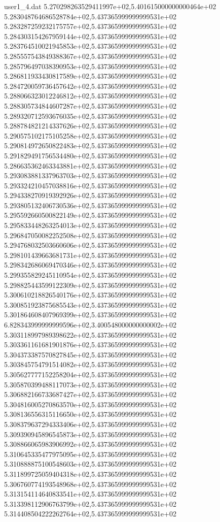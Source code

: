 \begin{filecontents}{user1_4.dat}
5.270298263529411997e+02,5.401615000000000464e+02
5.283048764686528784e+02,5.437365999999999531e+02
5.283287259232175757e+02,5.437365999999999531e+02
5.284303154267959144e+02,5.437365999999999531e+02
5.283764510021945853e+02,5.437365999999999531e+02
5.285557543849388367e+02,5.437365999999999531e+02
5.285796497038390953e+02,5.437365999999999531e+02
5.286811933430817589e+02,5.437365999999999531e+02
5.284720059736457642e+02,5.437365999999999531e+02
5.288066323012246812e+02,5.437365999999999531e+02
5.288305734844607287e+02,5.437365999999999531e+02
5.289320712593676035e+02,5.437365999999999531e+02
5.288784821214337626e+02,5.437365999999999531e+02
5.290575102175105258e+02,5.437365999999999531e+02
5.290814972650822483e+02,5.437365999999999531e+02
5.291829491756534480e+02,5.437365999999999531e+02
5.286635362463343881e+02,5.437365999999999531e+02
5.293083881337963703e+02,5.437365999999999531e+02
5.293324210457038816e+02,5.437365999999999531e+02
5.294338270919392926e+02,5.437365999999999531e+02
5.293805132406730536e+02,5.437365999999999531e+02
5.295592660500822149e+02,5.437365999999999531e+02
5.295833448263254013e+02,5.437365999999999531e+02
5.296847050082252508e+02,5.437365999999999531e+02
5.294768032503660606e+02,5.437365999999999531e+02
5.298101439663681731e+02,5.437365999999999531e+02
5.298342686069470346e+02,5.437365999999999531e+02
5.299355829245110954e+02,5.437365999999999531e+02
5.298825443599122309e+02,5.437365999999999531e+02
5.300610218826540176e+02,5.437365999999999531e+02
5.300851923875685543e+02,5.437365999999999531e+02
5.301864608407969399e+02,5.437365999999999531e+02
6.828343999999999596e+02,3.400548000000000002e+02
5.303118997989398622e+02,5.437365999999999531e+02
5.303361161681901876e+02,5.437365999999999531e+02
5.304373387570827845e+02,5.437365999999999531e+02
5.303845754791514082e+02,5.437365999999999531e+02
5.305627777152258204e+02,5.437365999999999531e+02
5.305870399488117073e+02,5.437365999999999531e+02
5.306882166733687427e+02,5.437365999999999531e+02
5.304816005270863570e+02,5.437365999999999531e+02
5.308136556315116650e+02,5.437365999999999531e+02
5.308379637294333406e+02,5.437365999999999531e+02
5.309390945896545873e+02,5.437365999999999531e+02
5.308866065983906992e+02,5.437365999999999531e+02
5.310645335477975095e+02,5.437365999999999531e+02
5.310888875100548603e+02,5.437365999999999531e+02
5.311899725059404318e+02,5.437365999999999531e+02
5.306760774193548968e+02,5.437365999999999531e+02
5.313154114640833541e+02,5.437365999999999531e+02
5.313398112906763799e+02,5.437365999999999531e+02
5.314408504222262764e+02,5.437365999999999531e+02

\end{filecontents}
